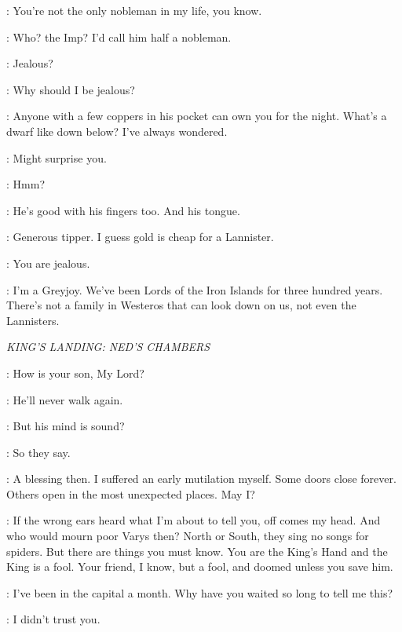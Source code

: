 \ROS: You're not the only nobleman in my life, you know. 

\THEON: Who? the Imp? I'd call him half a nobleman. 

\ROS: Jealous?

\THEON: Why should I be jealous? 


\THEON: Anyone with a few coppers in his pocket can own you for the night. What's a dwarf like down below? I've always wondered. 

\ROS: Might surprise you. 

\THEON: Hmm? 

\ROS: He's good with his fingers too. And his tongue. 

\THEON: Generous tipper. I guess gold is cheap for a Lannister. 

\ROS: You are jealous. 

\THEON: I'm a Greyjoy. We've been Lords of the Iron Islands for three hundred years. There's not a family in Westeros that can look down on us, not even the Lannisters. 


\scene

\textit{KING'S LANDING: NED'S CHAMBERS} 


\VARYS: How is your son, My Lord? 

\NED: He'll never walk again. 

\VARYS: But his mind is sound? 

\NED: So they say. 

\VARYS: A blessing then. I suffered an early mutilation myself. Some doors close forever.  Others open in the most unexpected places.  May I? 

\VARYS: If the wrong ears heard what I'm about to tell you, off comes my head. And who would mourn poor Varys then? North or South, they sing no songs for spiders. But there are things you must know. You are the King's Hand and the King is a fool. Your friend, I know, but a fool, and doomed unless you save him. 

\NED: I've been in the capital a month. Why have you waited so long to tell me this? 

\VARYS: I didn't trust you. 

